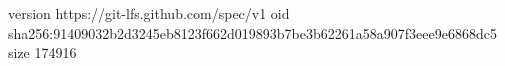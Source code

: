 version https://git-lfs.github.com/spec/v1
oid sha256:91409032b2d3245eb8123f662d019893b7be3b62261a58a907f3eee9e6868dc5
size 174916
